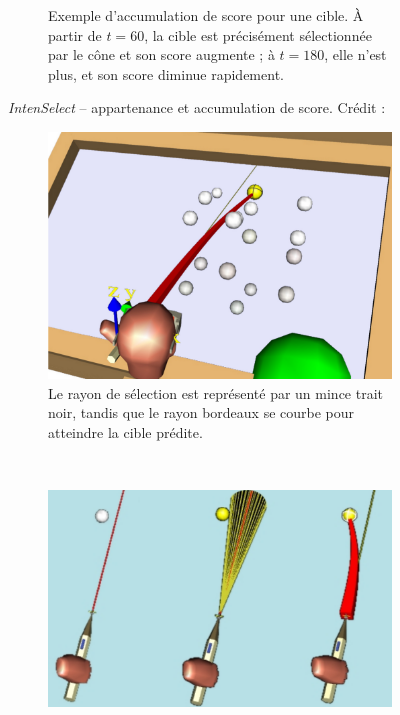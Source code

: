 \begin{appendices}
\begin{figure}[htbp]
\begin{subfigure}[t]{0.49\textwidth}
			\caption{Exemple d'accumulation de score pour une cible. À partir de $t = 60$, la cible est précisément sélectionnée par le cône et son score augmente ; à $t = 180$, elle n'est plus, et son score diminue rapidement.}
			\label{fig:intensAccumul}
		\end{subfigure}
		\caption[\emph{IntenSelect} -- appartenance et accumulation de score]{\emph{IntenSelect} -- appartenance et accumulation de score. Crédit : \cite{de2005intenselect}}
		\label{fig:intensConeAccumul}
	\end{figure}
	
	
	
	
	
	\begin{figure}[htbp]
		\begin{subfigure}[t]{0.46\textwidth}
			\centering
			\includegraphics[width=\textwidth]{figures/ch2/intenSnap}
			\caption{Le rayon de sélection est représenté par un mince trait noir, tandis que le rayon bordeaux se courbe pour atteindre la cible prédite.}
			\label{fig:intenSnap}
		\end{subfigure}
		~
		\begin{subfigure}[t]{0.52\textwidth}
			\centering
			\includegraphics[width=\textwidth]{figures/ch2/intenSnap2}

\end{subfigure}
\end{figure}
\end{appendices}
